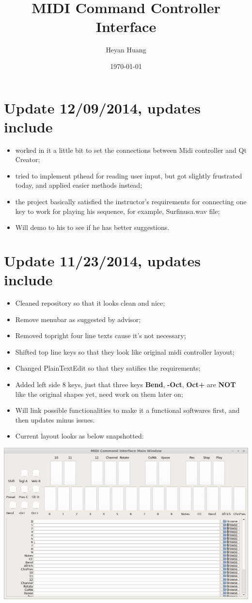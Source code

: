 \documentclass[9pt,b5paper]{article}
\author{Heyan Huang}
\date{\today}
\title{MIDI Command Controller Interface}
\begin{document}
\maketitle
\tableofcontents


\section{Update 12/09/2014, updates include}
\label{sec-1}
\begin{itemize}
\item worked in it a little bit to set the connections between Midi controller and Qt Creator;
\item tried to implement pthead for reading user input, but got slightly frustrated today, and applied easier methods instead;
\item the project basically satisfied the instructor's requirements for connecting one key to work for playing his sequence, for example, Surfinusa.wav file;
\item Will demo to his to see if he has better suggestions.
\end{itemize}

\section{Update 11/23/2014, updates include}
\label{sec-2}
\begin{itemize}
\item Cleaned repository so that it looks clean and nice;
\item Remove menubar as suggested by advisor;
\item Removed topright four line texts cause it's not necessary;
\item Shifted top line keys so that they look like original midi controller layout;
\item Changed PlainTextEdit so that they satifies the requirements;
\item Added left side 8 keys, just that three keys \textbf{Bend}, \textbf{-Oct}, \textbf{Oct+} are \textbf{NOT} like the original shapes yet, need work on them later on;
\item Will link possible functionalities to make it a functional softwares first, and then updates minus issues.
\item Current layout looks as below snapshotted:
\end{itemize}

\includegraphics[width=.9\linewidth]{./pic/Screenshot_from_2014-11-23_13:20:06.png}  
\end{document}
